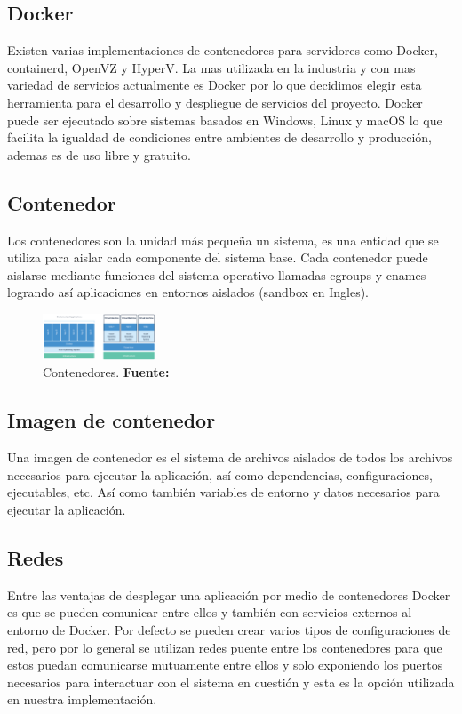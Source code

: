 \subsection{Docker}

Existen varias implementaciones de contenedores para servidores como Docker, containerd, OpenVZ y
HyperV. La mas utilizada en la industria y con mas variedad de servicios actualmente es
Docker por lo que decidimos elegir esta herramienta para el desarrollo y despliegue de servicios del
proyecto. Docker puede ser ejecutado sobre sistemas basados en Windows, Linux y macOS lo que
facilita la igualdad de condiciones entre ambientes de desarrollo y producción, ademas es de uso
libre y gratuito. \cite{alternativas_docker}

\subsection{Contenedor}

Los contenedores son la unidad más pequeña un sistema, es una entidad que se utiliza para aislar
cada componente del sistema base. Cada contenedor puede aislarse mediante funciones del sistema
operativo llamadas cgroups y cnames logrando así aplicaciones en entornos aislados (sandbox en
Ingles). \cite{Docker}
\begin{figure}[H]
	\begin{centering}
		\includegraphics[angle=0,width=0.3\textwidth]{Figuras/docker-container.png}
		\par \end{centering}
	\caption[Contenedores]{Contenedores. \textbf{Fuente:} \cite{Docker}}
	\label{Contenedores}
\end{figure}

\subsection{Imagen de contenedor}
Una imagen de contenedor es el sistema de archivos aislados de todos los archivos necesarios para
ejecutar la aplicación, así como dependencias, configuraciones, ejecutables, etc. Así como también
variables de entorno y datos necesarios para ejecutar la aplicación. \cite{Docker}

\subsection{Redes}
Entre las ventajas de desplegar una aplicación por medio de contenedores Docker es que se pueden
comunicar entre ellos y también con servicios externos al entorno de Docker. Por defecto se pueden
crear varios tipos de configuraciones de red, pero por lo general se utilizan redes puente entre
los contenedores para que estos puedan comunicarse mutuamente entre ellos y solo exponiendo los
puertos necesarios para interactuar con el sistema en cuestión y esta es la opción utilizada en
nuestra implementación. \cite{Docker}

